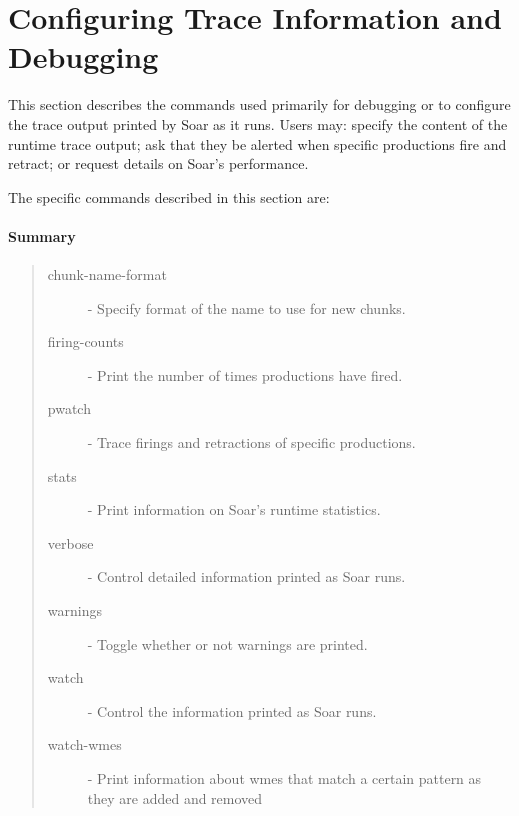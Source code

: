








\section{Configuring Trace Information and Debugging}
\label{DEBUG}

This section describes the commands used primarily for debugging or
to configure the trace output printed by Soar as it runs.  Users may:
specify the content of the runtime trace output; ask that
they be alerted when specific productions fire and retract; 
or request details on Soar's performance.

The specific commands described in this section are:


\paragraph{Summary}
\begin{quote}
\begin{description}
\item[chunk-name-format] - Specify format of the name to use for new chunks.
\item[firing-counts] - Print the number of times productions have fired.
\item[pwatch] - Trace firings and retractions of specific productions.
\item[stats] - Print information on Soar's runtime statistics.
\item[verbose] -  Control detailed information printed as Soar runs.
\item[warnings] - Toggle whether or not warnings are printed.
\item[watch] - Control the information printed as Soar runs.
\item[watch-wmes] -  Print information about wmes that match a certain pattern as they are added and removed
\end{description}
\end{quote}

